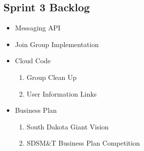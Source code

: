 \subsection{Sprint 3 Backlog}
\begin{itemize}
	\item Messaging API
	\item Join Group Implementation
	\item Cloud Code
	\begin{enumerate}
	\item Group Clean Up
	\item User Information Links
	\end{enumerate}
	\item Business Plan
	\begin{enumerate}
	\item South Dakota Giant Vision
	\item SDSM\&T Business Plan Competition
	\end{enumerate}
\end{itemize}

